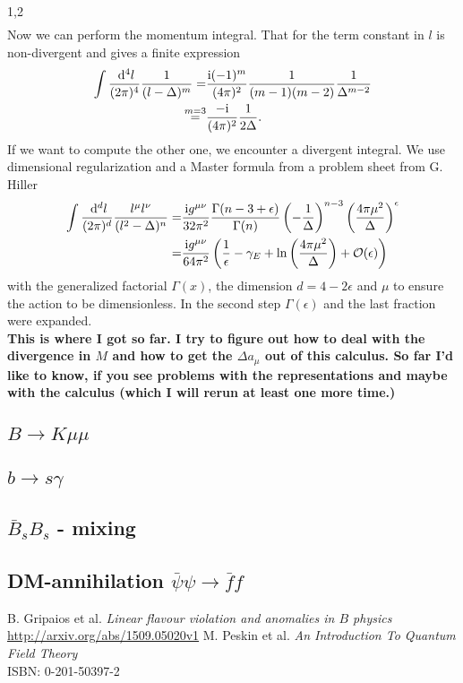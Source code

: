 \documentclass[11pt,a4paper,twoside]{article}
\begin{document}
\begin{spacing}{1,2}
\begin{align}
\end{align}
Now we can perform the momentum integral. That for the term constant in $l$ is non-divergent and gives a finite expression 
\begin{align}
 \int \frac{\; \mathrm{d}^4 l}{(2\pi)^4} \frac{1}{(l-\Delta)^m} =& \frac{\text{i}(-1)^m}{(4\pi)^2}\frac{1}{(m-1)(m-2)} \frac{1}{\Delta^{m-2}} \\
 \stackrel{m=3}{=}& \frac{-\text{i}}{(4\pi)^2}\frac{1}{2\Delta}.
\end{align}
If we want to compute the other one, we encounter a divergent integral. We use dimensional regularization and a Master formula from a problem sheet 
from G. Hiller
\begin{align}
 \int \frac{\; \mathrm{d}^d l}{(2\pi)^d} \frac{l^\mu l^\nu}{(l^2-\Delta)^n} =& \frac{\text{i}g^{\mu\nu}}{32\pi^2} \frac{\Gamma(n-3+\epsilon)}{\Gamma(n)}\left(-\frac{1}{\Delta}\right)^{n-3}\left(\frac{4\pi \mu^2}{\Delta}\right)^\epsilon\\
 =& \frac{\text{i}g^{\mu\nu}}{64\pi^2} \left(\frac{1}{\epsilon}-\gamma_E + \ln\left(\frac{4\pi\mu^2}{\Delta} \right) +\mathcal{O}(\epsilon) \right)
\end{align}
with the generalized factorial $\Gamma(x)$, the dimension $d=4-2\epsilon$ and $\mu$ to ensure the action to be dimensionless. In the second step
$\Gamma(\epsilon)$ and the last fraction were expanded. \\
\textbf{This is where I got so far. I try to figure out how to deal with the divergence in $M$ and how to get the $\Delta a_\mu$ out of this calculus.
So far I'd like to know, if you see problems with the representations and maybe with the calculus (which I will rerun at least one more time.)}


\subsection{$B \rightarrow K\mu\mu$}
\subsection{$b\rightarrow s\gamma$}
\subsection{$\bar B_s B_s$ - mixing}
\subsection{DM-annihilation $\bar \psi\psi \rightarrow \bar f f$ }



\newpage
\end{spacing}
\newpage
\begin{thebibliography}{xxx}
 B. Gripaios et al. \textit{Linear flavour violation and anomalies in $B$ physics}\\ \href{http://arxiv.org/abs/1509.05020v1}{http://arxiv.org/abs/1509.05020v1}
 M. Peskin et al. \textit{An Introduction To Quantum Field Theory}\\ ISBN: 0-201-50397-2
\end{thebibliography}
\end{document}

